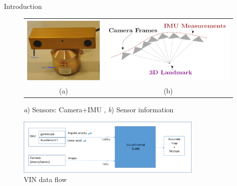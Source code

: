 \documentclass[8pt]{beamer}
\begin{document}
\begin{frame}{Introduction}
	
	\begin{figure}[!ht]
		\begin{center}\begin{tabular}{cc}
				\includegraphics[height=3.3cm]{figures/bumblebee_imu.png}&
				\includegraphics[height=3.3cm]{Figures/IMU-sample_Image-frames_3D_illustration.png}\\
				(a) & (b) \\
		\end{tabular}\end{center}
		\caption{\emph{a}) Sensors: Camera+IMU \cite{Tod2012}, \emph{b}) Sensor information \cite{Manifold2015}} 
		\label{fig:VIN sensor information}
	\end{figure} 
	
  \begin{figure}[ht]
  	\includegraphics[width=9cm]{figures/vin_data_flow.png}
  	\caption{VIN data flow}
  \end{figure}
	
\end{frame}
\end{document}
